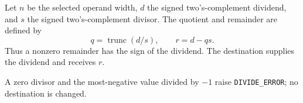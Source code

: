 Let \(n\) be the selected operand width, \(d\) the signed two's-complement dividend, and \(s\) the signed two's-complement divisor. The quotient and remainder are defined by
\[
  q = \operatorname{trunc}(d/s),
  \qquad r = d - qs .
\]
Thus a nonzero remainder has the sign of the dividend. The destination supplies the dividend and receives \(r\).

A zero divisor and the most-negative value divided by \(-1\) raise \texttt{DIVIDE\_ERROR}; no destination is changed.
